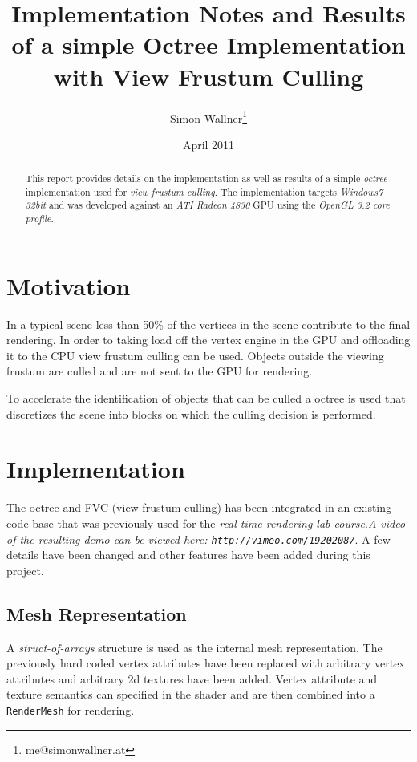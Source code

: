 \documentclass[a4, 12pt]{scrartcl}
\begin{document}
\title{Implementation Notes and Results of a simple Octree Implementation with View Frustum Culling}
\author{Simon Wallner\footnote{me@simonwallner.at}}
\date{April 2011}
\maketitle

\begin{abstract}
This report provides details on the implementation as well as results of a simple \emph{octree} implementation used for \emph{view frustum culling}. The implementation targets \emph{Windows7 32bit} and was developed against an \emph{ATI Radeon 4830} GPU using the \emph{OpenGL 3.2 core profile}.
\end{abstract}

\section{Motivation}
In a typical scene less than 50\% of the vertices in the scene contribute to the final rendering. In order to taking load off the vertex engine in the GPU and offloading it to the CPU view frustum culling can be used. Objects outside the viewing frustum are culled and are not sent to the GPU for rendering.

To accelerate the identification of objects that can be culled a octree is used that discretizes the scene into blocks on which the culling decision is performed.

\section{Implementation}
The octree and FVC (view frustum culling) has been integrated in an existing code base that was previously used for the \emph{real time rendering lab course}.\emph{A video of the resulting demo can be viewed here: \texttt{http://vimeo.com/19202087}}. A few details have been changed and other features have been added during this project.

\subsection{Mesh Representation}
A \emph{struct-of-arrays} structure is used as the internal mesh representation. The previously hard coded vertex attributes have been replaced with arbitrary vertex attributes and arbitrary 2d textures have been added. Vertex attribute and texture semantics can specified in the shader and are then combined into a \texttt{RenderMesh} for rendering.
\end{document}
